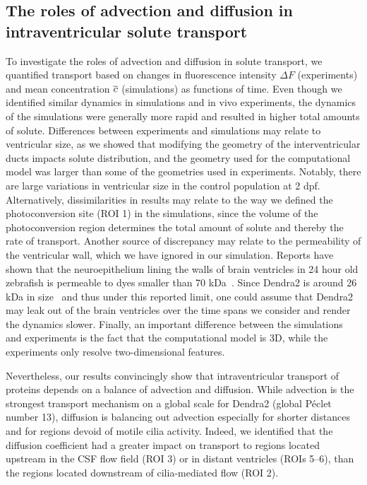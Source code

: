 \documentclass{WileyMSP-template}
\begin{document}
\subsection{The roles of advection and diffusion in intraventricular solute transport}
To investigate the roles of advection and diffusion in solute transport, we quantified transport
based on changes in fluorescence intensity $\Delta F$ (experiments) and
mean concentration $\overline{c}$ (simulations) as functions of time.
Even though we identified similar dynamics in simulations and
in vivo experiments, the dynamics of the simulations were generally
more rapid and resulted in higher total amounts of solute.
Differences between experiments and simulations may relate to
ventricular size, as we showed that modifying the geometry of the interventricular ducts
impacts solute distribution, and the geometry used for the computational model was larger
than some of the geometries used in experiments.
Notably, there are large variations in ventricular size in the control population at 2 dpf.
Alternatively, dissimilarities in results may relate
to the way we defined the photoconversion site (ROI 1) in the simulations,
since the volume of the photoconversion region determines
the total amount of solute and thereby the rate of transport. Another source
of discrepancy may relate to the permeability of the ventricular wall,
which we have ignored in our simulation. Reports have shown that the
neuroepithelium lining the walls of brain ventricles in 24 hour old zebrafish
is permeable to dyes smaller than 70 kDa~\cite{Chang2012AnNeuroepithelium}.
Since Dendra2 is around 26 kDa in size~\cite{Gurskaya2006EngineeringLight} and
thus under this reported limit, one could assume that Dendra2 may
leak out of the brain ventricles over the time spans we consider
and render the dynamics slower. Finally, an important difference
between the simulations and experiments is the fact that the
computational model is 3D, while the experiments only resolve
two-dimensional features.

Nevertheless, our results convincingly show that
intraventricular transport of proteins depends on a balance of advection and diffusion.
While advection is the strongest transport mechanism on a global scale for
Dendra2 (global Péclet number 13), diffusion is balancing out
advection especially for shorter distances and for regions devoid of motile cilia activity.
Indeed, we identified that the diffusion coefficient had a greater impact on transport to
regions located upstream in the CSF flow field (ROI 3) or in distant ventricles (ROIs 5--6),
than the regions located downstream of cilia-mediated flow (ROI 2). 
\end{document}
